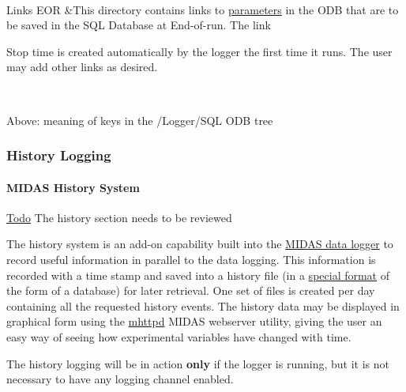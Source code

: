 \begin{table}[h]
\begin{TabularC}{2}
\\
\label{F_mySQL_F_Logger_Links_EOR}
\hypertarget{F_mySQL_F_Logger_Links_EOR}{}
 Links EOR  &This directory contains links to \hyperlink{structparameters}{parameters} in the ODB that are to be saved in the SQL Database at End-\/of-\/run. The link
\begin{DoxyItemize}
\item Stop time is created automatically by the logger the first time it runs. The user may add other links as desired.   
\end{DoxyItemize}\\
\end{TabularC}
\centering
\caption{Above: meaning of keys in the /Logger/SQL ODB tree }
\end{table}
\par
 

\label{index_end}
\hypertarget{index_end}{}
 \subsubsection{History Logging}\label{F_History_logging}
\par
 \label{F_History_logging_idx_Logging_History}
\hypertarget{F_History_logging_idx_Logging_History}{}
 \label{F_History_logging_idx_History_Logging}
\hypertarget{F_History_logging_idx_History_Logging}{}
 

\par
 \label{F_History_logging_idx_history_system}
\hypertarget{F_History_logging_idx_history_system}{}
\hypertarget{F_History_logging_F_History_System}{}\paragraph{MIDAS History System}\label{F_History_logging_F_History_System}
\begin{Desc}
\item[\hyperlink{todo__todo000007}{Todo}]The history section needs to be reviewed\end{Desc}
The history system is an add-\/on capability built into the \hyperlink{F_Logging_F_mlogger_utility}{MIDAS data logger} to record useful information in parallel to the data logging. This information is recorded with a time stamp and saved into a history file (in a \hyperlink{F_History_logging_F_History_format}{special format} of the form of a database) for later retrieval. One set of files is created per day containing all the requested history events. The history data may be displayed in graphical form using the \hyperlink{RC_mhttpd_utility}{mhttpd} MIDAS webserver utility, giving the user an easy way of seeing how experimental variables have changed with time. \par
 The history logging will be in action {\bfseries only} if the logger is running, but it is not necessary to have any logging channel enabled.

